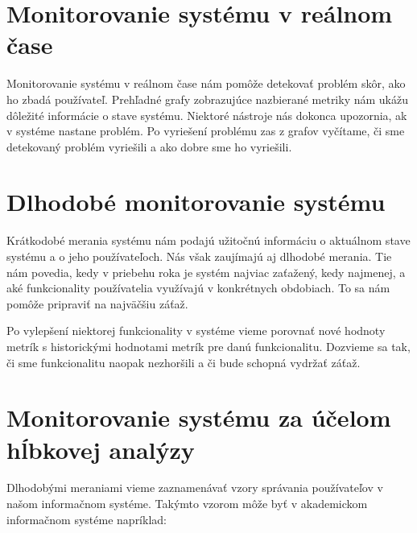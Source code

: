 \documentclass[a4paper, upjsfrontpage, thesismargins, thesislinespacing]{rnthesis}
\begin{document}
\section{Monitorovanie systému v reálnom čase}

Monitorovanie systému v reálnom čase nám pomôže detekovať problém skôr, ako ho zbadá používateľ.
Prehľadné grafy zobrazujúce nazbierané metriky nám ukážu dôležité informácie o stave systému.
Niektoré nástroje nás dokonca upozornia, ak v systéme nastane problém.
Po vyriešení problému zas z grafov vyčítame, či sme detekovaný problém vyriešili a ako dobre sme ho vyriešili.

\section{Dlhodobé monitorovanie systému}

Krátkodobé merania systému nám podajú užitočnú informáciu o aktuálnom stave systému a o jeho používateľoch.
Nás však zaujímajú aj dlhodobé merania.
Tie nám povedia, kedy v priebehu roka je systém najviac zaťažený, kedy najmenej, a aké funkcionality používatelia využívajú v konkrétnych obdobiach.
To sa nám pomôže pripraviť na najväčšiu záťaž.

Po vylepšení niektorej funkcionality v systéme vieme porovnať nové hodnoty metrík s historickými hodnotami metrík pre danú funkcionalitu.
Dozvieme sa tak, či sme funkcionalitu naopak nezhoršili a či bude schopná vydržať záťaž.

\section{Monitorovanie systému za účelom hĺbkovej analýzy}

Dlhodobými meraniami vieme zaznamenávať vzory správania používateľov v našom informačnom systéme.
Takýmto vzorom môže byť v akademickom informačnom systéme napríklad:
\end{document}
